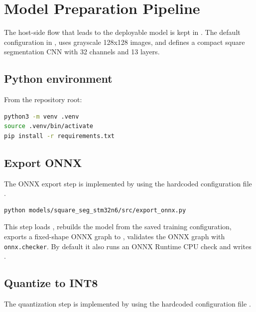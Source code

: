 \documentclass[11pt,a4paper]{article}
\begin{document}
\section{Model Preparation Pipeline}

The host-side flow that leads to the deployable model is kept in
. The default configuration in
, uses grayscale 128x128 images, and defines a compact
square segmentation CNN with 32 channels and 13 layers.

\subsection{Python environment}

From the repository root:

\begin{lstlisting}[language=bash]
python3 -m venv .venv
source .venv/bin/activate
pip install -r requirements.txt
\end{lstlisting}

\subsection{Export ONNX}

The ONNX export step is implemented by
 using the hardcoded configuration file
.

\begin{lstlisting}[language=bash]
python models/square_seg_stm32n6/src/export_onnx.py
\end{lstlisting}

This step loads , rebuilds the model from the saved training
configuration, exports a fixed-shape ONNX graph to
, validates the ONNX graph with
\texttt{onnx.checker}. By default it also runs an ONNX Runtime CPU check and writes
.

\subsection{Quantize to INT8}

The quantization step is implemented by
 using the hardcoded configuration file
.
\end{document}
